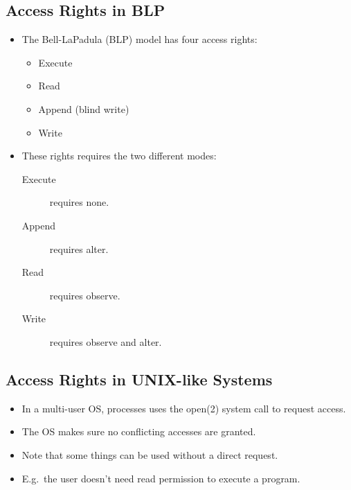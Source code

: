 \documentclass{beamer}
\begin{document}
\subsection{Access Rights in BLP}

\begin{frame}{\insertsubsectionhead}
  \begin{itemize}
    \item The Bell-LaPadula (BLP) model has four access rights:
      \begin{itemize}
        \item Execute
        \item Read
        \item Append (blind write)
        \item Write
      \end{itemize}

    \item These rights requires the two different modes:
      \begin{description}
        \item[Execute] requires none.
        \item[Append] requires alter.
        \item[Read] requires observe.
        \item[Write] requires observe and alter.
      \end{description}
  \end{itemize}
\end{frame}

\subsection{Access Rights in UNIX-like Systems}

\begin{frame}{\insertsubsectionhead}
  \begin{itemize}
    \item In a multi-user OS, processes uses the open(2) system call to request 
      access.

    \item The OS makes sure no conflicting accesses are granted.

    \item Note that some things can be used without a direct request.

    \item E.g.\ the user doesn't need read permission to execute a program.

  \end{itemize}
\end{frame}
\end{document}
